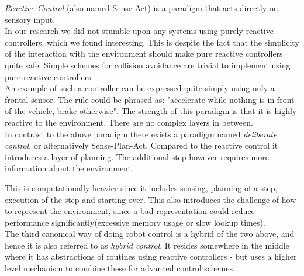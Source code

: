 \textit{Reactive Control} (also named Sense-Act) is a paradigm that acts directly on sensory input.\\
In our research we did not stumble upon any systems using purely reactive controllers, which we found interesting. This is despite the fact that the simplicity of the interaction with the environment should make pure reactive controllers quite safe.
Simple schemes for collision avoidance are trivial to implement using pure reactive controllers.\\
An example of such a controller can be expressed quite simply using only a frontal sensor. The rule could be phrased as: "accelerate while nothing is in front of the vehicle, brake otherwise".
The strength of this paradigm is that it is highly reactive to the environment. There are no complex layers in between.\\

In contrast to the above paradigm there exists a paradigm named \textit{deliberate control}, or alternatively Sense-Plan-Act.
Compared to the reactive control it introduces a layer of planning.
The additional step however requires more information about the environment.

This is computationally heavier since it includes sensing, planning of a step, execution of the step and starting over.
This also introduces the challenge of how to represent the environment, since a bad representation could reduce performance significantly(excessive memory usage or slow lookup times).\\

The third canonical way of doing robot control is a hybrid of the two above, and hence it is also referred to as \textit{hybrid control}.
It resides somewhere in the middle where it has abstractions of routines using reactive controllers - but uses a higher level mechanism to combine these for advanced control schemes.\\


\\



